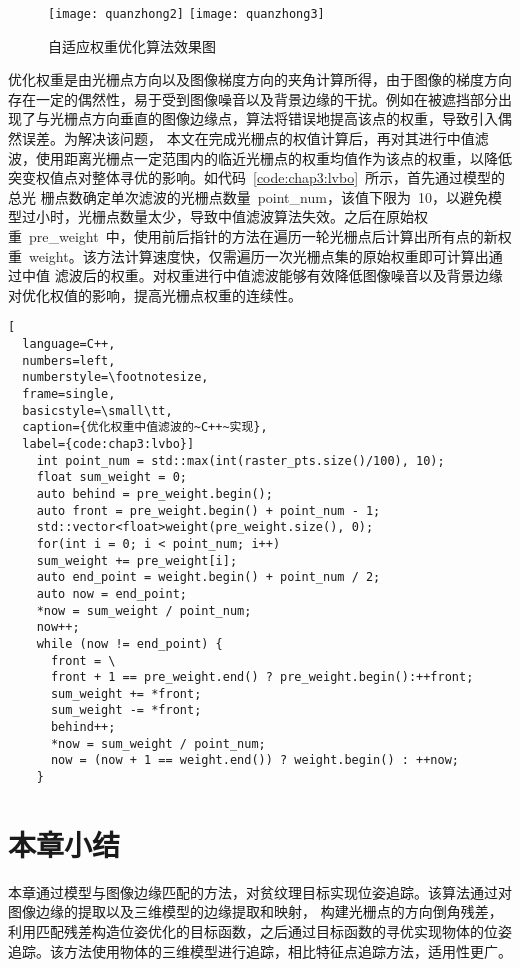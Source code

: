 \begin{figure}[t] %
  \centering%
    \texttt{[image: quanzhong2]}\hspace{2em}%
    \texttt{[image: quanzhong3]}%
  \caption{自适应权重优化算法效果图}
  \label{fig:chap03:quanzhong}
\end{figure}

优化权重是由光栅点方向以及图像梯度方向的夹角计算所得，由于图像的梯度方向存在一定的偶然性，易于受到图像噪音以及背景边缘的干扰。例如在被遮挡部分出现了与光栅点方向垂直的图像边缘点，算法将错误地提高该点的权重，导致引入偶然误差。为解决该问题，
本文在完成光栅点的权值计算后，再对其进行中值滤波，使用距离光栅点一定范围内的临近光栅点的权重均值作为该点的权重，以降低突变权值点对整体寻优的影响。如代码~\ref{code:chap3:lvbo}~所示，首先通过模型的总光
栅点数确定单次滤波的光栅点数量~point\_num，该值下限为~10，以避免模型过小时，光栅点数量太少，导致中值滤波算法失效。之后在原始权重~pre\_weight~中，使用前后指针的方法在遍历一轮光栅点后计算出所有点的新权重~weight。该方法计算速度快，仅需遍历一次光栅点集的原始权重即可计算出通过中值
滤波后的权重。对权重进行中值滤波能够有效降低图像噪音以及背景边缘对优化权值的影响，提高光栅点权重的连续性。


\begin{lstlisting}[
  language=C++,
  numbers=left,                
  numberstyle=\footnotesize,
  frame=single,     
  basicstyle=\small\tt,    
  caption={优化权重中值滤波的~C++~实现},
  label={code:chap3:lvbo}]
    int point_num = std::max(int(raster_pts.size()/100), 10);
    float sum_weight = 0;
    auto behind = pre_weight.begin();         
    auto front = pre_weight.begin() + point_num - 1;  
    std::vector<float>weight(pre_weight.size(), 0);                 
    for(int i = 0; i < point_num; i++)
    sum_weight += pre_weight[i];
    auto end_point = weight.begin() + point_num / 2;
    auto now = end_point;
    *now = sum_weight / point_num;
    now++;
    while (now != end_point) {
      front = \ 
      front + 1 == pre_weight.end() ? pre_weight.begin():++front;
      sum_weight += *front;
      sum_weight -= *front;
      behind++;
      *now = sum_weight / point_num;
      now = (now + 1 == weight.end()) ? weight.begin() : ++now;
    }
  \end{lstlisting}


\section{本章小结}
\label{sec:chapter3_summary}
本章通过模型与图像边缘匹配的方法，对贫纹理目标实现位姿追踪。该算法通过对图像边缘的提取以及三维模型的边缘提取和映射，
构建光栅点的方向倒角残差，利用匹配残差构造位姿优化的目标函数，之后通过目标函数的寻优实现物体的位姿追踪。该方法使用物体的三维模型进行追踪，相比特征点追踪方法，适用性更广。

